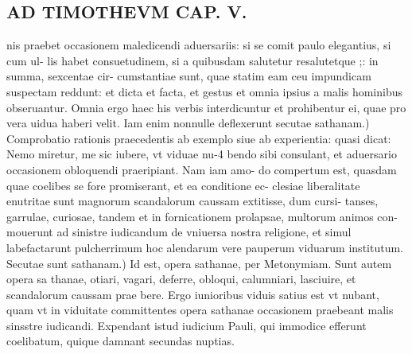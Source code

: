 \documentclass{article}
\begin{document}
\begin{pages}
\section*{AD TIMOTHEVM CAP. V. }
\marginpar{[ p.111 ]}\pstart nis praebet occasionem maledicendi aduersariis: si se comit paulo elegantius, si cum ul- lis habet consuetudinem, si a quibusdam salutetur resalutetque ;: in summa, sexcentae cir- cumstantiae sunt, quae statim eam ceu impundicam suspectam reddunt: et dicta et facta, et gestus et omnia ipsius a malis hominibus obseruantur. Omnia ergo haec his verbis interdicuntur et prohibentur ei, quae pro vera uidua haberi velit.  \pend\pstart Iam enim nonnulle deflexerunt secutae sathanam.) Comprobatio rationis praecedentis ab exemplo siue ab experientia: quasi dicat: Nemo miretur, me sic iubere, vt viduae nu-4 bendo sibi consulant, et aduersario occasionem obloquendi praeripiant. Nam iam amo- do compertum est, quasdam quae coelibes se fore promiserant, et ea conditione ec- clesiae liberalitate enutritae sunt magnorum scandalorum caussam extitisse, dum cursi- tanses, garrulae, curiosae, tandem et in fornicationem prolapsae, multorum animos con- mouerunt ad sinistre iudicandum de vniuersa nostra religione, et simul labefactarunt pulcherrimum hoc alendarum vere pauperum viduarum institutum.  \pend\pstart Secutae sunt sathanam.) Id est, opera sathanae, per Metonymiam. Sunt autem opera sa thanae, otiari, vagari, deferre, obloqui, calumniari, lasciuire, et scandalorum caussam prae bere. Ergo iunioribus viduis satius est vt nubant, quam vt in viduitate committentes opera sathanae occasionem praebeant malis sinsstre iudicandi. Expendant istud iudicium Pauli, qui immodice efferunt coelibatum, quique damnant secundas nuptias.  \pend
{}
{}

\end{pages}
\end{document}
